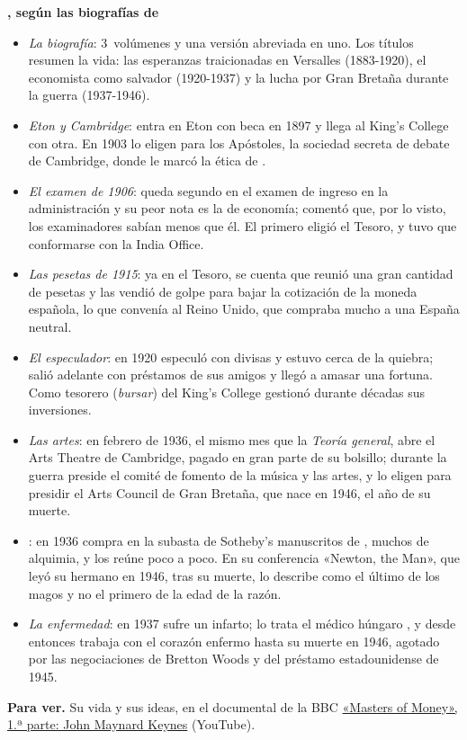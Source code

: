 \documentclass[11pt]{article}
\begin{document}
\begin{anotaciones}
\textbf{, según las biografías de }
\begin{itemize}
\item \emph{La biografía}: 3~volúmenes\nocite{Skidelsky1983Hopes,Skidelsky1992Saviour,Skidelsky2000Fighting} y una versión abreviada en uno\nocite{Skidelsky2003Keynes}. Los títulos resumen la vida: las esperanzas traicionadas en Versalles (1883-1920), el economista como salvador (1920-1937) y la lucha por Gran Bretaña durante la guerra (1937-1946).
\item \emph{Eton y Cambridge}: entra en Eton con beca en 1897 y llega al King's College con otra. En 1903 lo eligen para los Apóstoles, la sociedad secreta de debate de Cambridge, donde le marcó la ética de \nocite{Skidelsky1983Hopes}.
\item \emph{El examen de 1906}: queda segundo en el examen de ingreso en la administración y su peor nota es la de economía; comentó que, por lo visto, los examinadores sabían menos que él. El primero eligió el Tesoro, y  tuvo que conformarse con la India Office\nocite{Skidelsky1983Hopes}.
\item \emph{Las pesetas de 1915}: ya en el Tesoro, se cuenta que reunió una gran cantidad de pesetas y las vendió de golpe para bajar la cotización de la moneda española, lo que convenía al Reino Unido, que compraba mucho a una España neutral\nocite{Lekachman1966Age}.
\item \emph{El especulador}: en 1920 especuló con divisas y estuvo cerca de la quiebra; salió adelante con préstamos de sus amigos y llegó a amasar una fortuna. Como tesorero (\emph{bursar}) del King's College gestionó durante décadas sus inversiones\nocite{Skidelsky1992Saviour,Accominotti2016Smart}.
\item \emph{Las artes}: en febrero de 1936, el mismo mes que la \emph{Teoría general}, abre el Arts Theatre de Cambridge, pagado en gran parte de su bolsillo; durante la guerra preside el comité de fomento de la música y las artes, y lo eligen para presidir el Arts Council de Gran Bretaña, que nace en 1946, el año de su muerte\nocite{Skidelsky2000Fighting}.
\item \emph{}: en 1936 compra en la subasta de Sotheby's manuscritos de , muchos de alquimia, y los reúne poco a poco. En su conferencia «Newton, the Man», que leyó su hermano  en 1946, tras su muerte, lo describe como el último de los magos y no el primero de la edad de la razón\nocite{Skidelsky2000Fighting}.
\item \emph{La enfermedad}: en 1937 sufre un infarto; lo trata el médico húngaro , y desde entonces trabaja con el corazón enfermo hasta su muerte en 1946, agotado por las negociaciones de Bretton Woods y del préstamo estadounidense de 1945\nocite{Skidelsky2000Fighting}.
\end{itemize}
\textbf{Para ver.} Su vida y sus ideas, en el documental de la BBC \href{https://www.youtube.com/watch?v=CkHooEp3vRE}{«Masters of Money», 1.ª parte: John Maynard Keynes} (YouTube).
\end{anotaciones}
\end{document}
